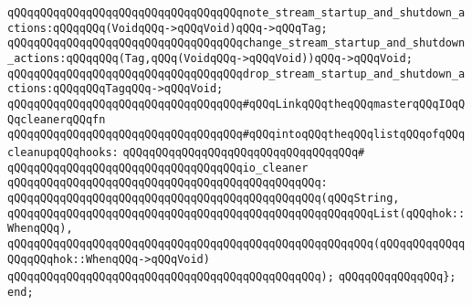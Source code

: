 \newline
\verb|qQQqqQQqqQQqqQQqqQQqqQQqqQQqqQQqqQQqnote_stream_startup_and_shutdown_actions:qQQqqQQq(VoidqQQq->qQQqVoid)qQQq->qQQqTag;|\newline
\newline
\verb|qQQqqQQqqQQqqQQqqQQqqQQqqQQqqQQqqQQqchange_stream_startup_and_shutdown_actions:qQQqqQQq(Tag,qQQq(VoidqQQq->qQQqVoid))qQQq->qQQqVoid;|\newline
\newline
\verb|qQQqqQQqqQQqqQQqqQQqqQQqqQQqqQQqqQQqdrop_stream_startup_and_shutdown_actions:qQQqqQQqTagqQQq->qQQqVoid;|\newline
\newline
\newline
\verb|qQQqqQQqqQQqqQQqqQQqqQQqqQQqqQQqqQQq#qQQqLinkqQQqtheqQQqmasterqQQqIOqQQqcleanerqQQqfn|\newline
\verb|qQQqqQQqqQQqqQQqqQQqqQQqqQQqqQQqqQQq#qQQqintoqQQqtheqQQqlistqQQqofqQQqcleanupqQQqhooks:|\newline
\verb|qQQqqQQqqQQqqQQqqQQqqQQqqQQqqQQqqQQq#|\newline
\verb|qQQqqQQqqQQqqQQqqQQqqQQqqQQqqQQqqQQqio_cleaner|\newline
\verb|qQQqqQQqqQQqqQQqqQQqqQQqqQQqqQQqqQQqqQQqqQQqqQQq:|\newline
\verb|qQQqqQQqqQQqqQQqqQQqqQQqqQQqqQQqqQQqqQQqqQQqqQQq(qQQqString,|\newline
\verb|qQQqqQQqqQQqqQQqqQQqqQQqqQQqqQQqqQQqqQQqqQQqqQQqqQQqqQQqList(qQQqhok::WhenqQQq),|\newline
\verb|qQQqqQQqqQQqqQQqqQQqqQQqqQQqqQQqqQQqqQQqqQQqqQQqqQQqqQQq(qQQqqQQqqQQqqQQqqQQqhok::WhenqQQq->qQQqVoid)|\newline
\verb|qQQqqQQqqQQqqQQqqQQqqQQqqQQqqQQqqQQqqQQqqQQqqQQq);|\newline
\newline
\verb|qQQqqQQqqQQqqQQq};|\newline
\verb|end;|\newline
\newline

